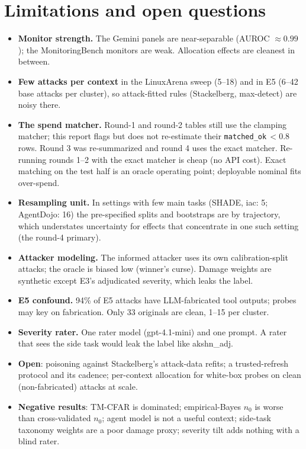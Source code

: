 \documentclass[11pt]{article}
\begin{document}
\section{Limitations and open questions}
\begin{itemize}
\item \textbf{Monitor strength.} The Gemini panels are near-separable (AUROC $\approx0.99$); the MonitoringBench monitors are weak. Allocation effects are cleanest in between.
\item \textbf{Few attacks per context} in the LinuxArena sweep (5--18) and in E5 (6--42 base attacks per cluster), so attack-fitted rules (Stackelberg, max-detect) are noisy there.
\item \textbf{The spend matcher.} Round-1 and round-2 tables still use the clamping matcher; this report flags but does not re-estimate their \texttt{matched\_ok}$\,<0.8$ rows. Round 3 was re-summarized and round 4 uses the exact matcher. Re-running rounds 1--2 with the exact matcher is cheap (no API cost). Exact matching on the test half is an oracle operating point; deployable nominal fits over-spend.
\item \textbf{Resampling unit.} In settings with few main tasks (SHADE, iac: 5; AgentDojo: 16) the pre-specified splits and bootstraps are by trajectory, which understates uncertainty for effects that concentrate in one such setting (the round-4 primary).
\item \textbf{Attacker modeling.} The informed attacker uses its own calibration-split attacks; the oracle is biased low (winner's curse). Damage weights are synthetic except E3's adjudicated severity, which leaks the label.
\item \textbf{E5 confound.} 94\% of E5 attacks have LLM-fabricated tool outputs; probes may key on fabrication. Only 33 originals are clean, 1--15 per cluster.
\item \textbf{Severity rater.} One rater model (gpt-4.1-mini) and one prompt. A rater that sees the side task would leak the label like akshn\_adj.
\item \textbf{Open}: poisoning against Stackelberg's attack-data refits; a trusted-refresh protocol and its cadence; per-context allocation for white-box probes on clean (non-fabricated) attacks at scale.
\item \textbf{Negative results}: TM-CFAR is dominated; empirical-Bayes $n_0$ is worse than cross-validated $n_0$; agent model is not a useful context; side-task taxonomy weights are a poor damage proxy; severity tilt adds nothing with a blind rater.
\end{itemize}
\end{document}
